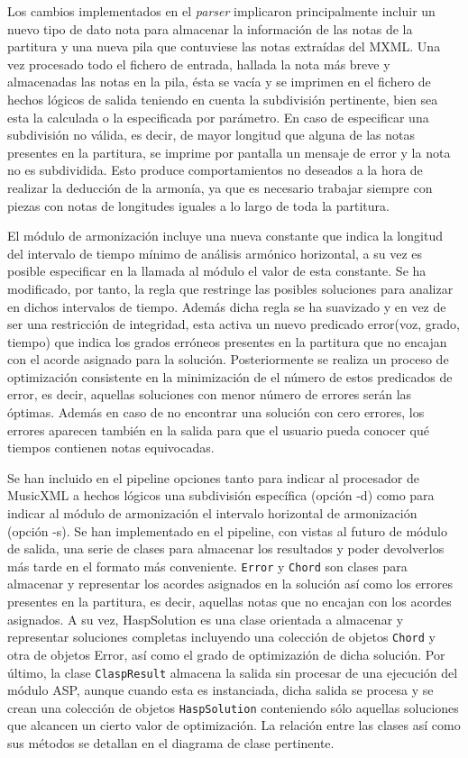 Los cambios implementados en el \textit{parser} implicaron principalmente incluir un nuevo tipo de dato nota para almacenar la información de las notas de la partitura y una nueva pila que contuviese las notas extraídas del MXML. Una vez procesado todo el fichero de entrada, hallada la nota más breve y almacenadas las notas en la pila, ésta se vacía y se imprimen en el fichero de hechos lógicos de salida teniendo en cuenta la subdivisión pertinente, bien sea esta la calculada o la especificada por parámetro. En caso de especificar una subdivisión no válida, es decir, de mayor longitud que alguna de las notas presentes en la partitura, se imprime por pantalla un mensaje de error y la nota no es subdividida. Esto produce comportamientos no deseados a la hora de realizar la deducción de la armonía, ya que es necesario trabajar siempre con piezas con notas de longitudes iguales a lo largo de toda la partitura.

El módulo de armonización incluye una nueva constante que indica la longitud del intervalo de tiempo mínimo de análisis armónico horizontal, a su vez es posible especificar en la llamada al módulo el valor de esta constante. Se ha modificado, por tanto, la regla que restringe las posibles soluciones para analizar en dichos intervalos de tiempo. Además dicha regla se ha suavizado y en vez de ser una restricción de integridad, esta activa un nuevo predicado error(voz, grado, tiempo) que indica los grados erróneos presentes en la partitura que no encajan con el acorde asignado para la solución. Posteriormente se realiza un proceso de optimización consistente en la minimización de el número de estos predicados de error, es decir, aquellas soluciones con menor número de errores serán las óptimas. Además en caso de no encontrar una solución con cero errores, los errores aparecen también en la salida para que el usuario pueda conocer qué tiempos contienen notas equivocadas.

Se han incluido en el pipeline opciones tanto para indicar al procesador de MusicXML a hechos lógicos una subdivisión específica (opción -d) como para indicar al módulo de armonización el intervalo horizontal de armonización (opción -s). Se han implementado en el pipeline, con vistas al futuro de módulo de salida, una serie de clases para almacenar los resultados y poder devolverlos más tarde en el formato más conveniente. \texttt{Error} y \texttt{Chord} son clases para almacenar y representar los acordes asignados en la solución así como los errores presentes en la partitura, es decir, aquellas notas que no encajan con los acordes asignados. A su vez, HaspSolution es una clase orientada a almacenar y representar soluciones completas incluyendo una colección de objetos \texttt{Chord} y otra de objetos Error, así como el grado de optimizazión de dicha solución. Por último, la clase \texttt{ClaspResult} almacena la salida sin procesar de una ejecución del módulo ASP, aunque cuando esta es instanciada, dicha salida se procesa y se crean una colección de objetos \texttt{HaspSolution} conteniendo sólo aquellas soluciones que alcancen un cierto valor de optimización. La relación entre las clases así como sus métodos se detallan en el diagrama de clase pertinente.

